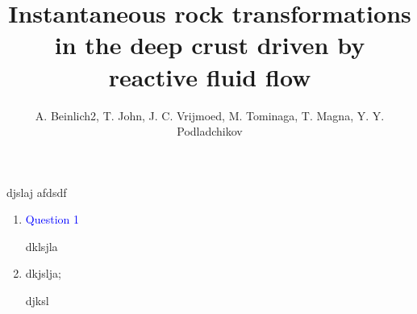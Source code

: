 \documentclass[a4paper]{article}
\title{Instantaneous rock transformations in the deep crust driven by reactive fluid flow}
\author{A. Beinlich2, T. John, J. C. Vrijmoed, M. Tominaga, T. Magna, Y. Y. Podladchikov}
\begin{document}
\maketitle

djslaj  afdsdf
 
\begin{enumerate}
	\item \textcolor{blue}{Question 1}
	
	dklsjla
	
	\item dkjslja;
	
	djksl
	
\end{enumerate}


%
%
%
%
%
%
\end{document}
